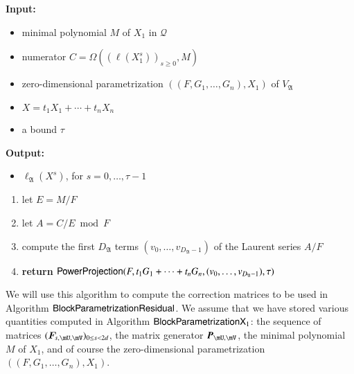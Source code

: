 \documentclass[final,1p,times,authoryear]{elsarticle}
\newcommand{\mat}[1]{\bm{\MakeUppercase{#1}}} %
\newcommand{\seqelt}[1]{\bm{F}_{#1}} %
\newcommand{\mainalgoname}{\mathsf{ BlockParametrization}}
\newcommand{\lf}{X}
\newcommand{\residueI}{\mathscr{Q}}
\begin{document}
\begin{algorithm}[H]
  \caption{${\sf Decompose}(M, C, ((F,G_1,\dots,G_n),X_1), \lf,\tau)$} {\bf
  Input:} \vspace{-0.5em}
  \begin{itemize}
    \item minimal polynomial $M$ of $X_1$ in $\residueI$
    \item numerator $C=\Omega( (\ell(X_1^s))_{s \ge 0}, M)$
    \item zero-dimensional parametrization $((F,G_1,\dots,G_n),X_1)$ of $V_\mathfrak{A}$
    \item $\lf =t_1 X_1 + \cdots + t_n X_n$
    \item a bound $\tau$
  \end{itemize}
  {\bf Output:}  \vspace{-0.5em}
  \begin{itemize}
    \item $\ell_\mathfrak{A}(\lf^s)$, for $s=0,\dots,\tau-1$
  \end{itemize}
  \begin{enumerate}
    \item let $E=M/F$
    \item let $A=C/E \bmod F$
    \item compute the first $D_\mathfrak{A}$ terms $(v_0,\dots,v_{D_\mathfrak{A}-1})$ of the Laurent series $A/F$
    \item {\bf return} ${\sf PowerProjection}(F, t_1 G_1 + \cdots + t_n G_n, (v_0,\dots,v_{D_\mathfrak{A}-1}),\tau)$
  \end{enumerate}
\end{algorithm}

We will use this algorithm to compute the correction matrices to be
used in Algorithm $\mainalgoname{\sf Residual}$. We assume that we
have stored various quantities computed in Algorithm
$\mainalgoname{\sf X}_1$: the sequence of matrices
$(\seqelt{s,\mU,\mV})_{0 \le s < 2d}$, the matrix generator
$\mat{P}_{\mU,\mV}$, the minimal polynomial $M$ of $X_1$, and of
course the zero-dimensional parametrization $((F,G_1,\dots,G_n),X_1)$.
\end{document}
